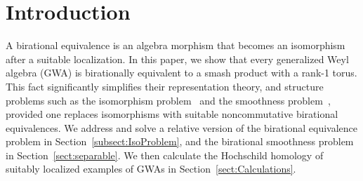 \documentclass[pdftex]{sigma}
\numberwithin{equation}{section}
\begin{document}
\allowdisplaybreaks

\newcommand{\arXivNumber}{2009.14801}

\renewcommand{\PaperNumber}{063}

\FirstPageHeading









\section{Introduction}

A birational equivalence is an algebra morphism that becomes an isomorphism after a suitable
localization. In this paper, we show that every generalized Weyl algebra (GWA) is birationally
equivalent to a smash product with a rank-1 torus. This fact significantly simplifies their
representation theory, and structure problems such as the isomorphism
problem~\cite{BavulaJordan:IsoProblem,Hodges:NCDeformations, RichardSolotar:IsoProblem,
 AlvarezVivaz:IsomorphismsOfQGWAs, Tang:IsoProblem} and the smoothness
problem~\cite{Bavula:GlobalDim, Hodges:NCDeformations,
 Liu:HomologicalSmoothnessI,Liu:HomologicalSmoothnessII, SolotarAlvarezVivas:QuantumGeneralizedWeyl}, provided one replaces isomorphisms with
suitable noncommutative birational equivalences. We address and solve a relative version of the
birational equivalence problem in Section~\ref{subsect:IsoProblem}, and the birational smoothness
problem in Section~\ref{sect:separable}. We then calculate the Hochschild homology of suitably
localized examples of GWAs in Section~\ref{sect:Calculations}.
\end{document}
